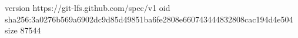 version https://git-lfs.github.com/spec/v1
oid sha256:3a0276b569a6902dc9d85d49851ba6fe2808e660743444832808cac194d4e504
size 87544
